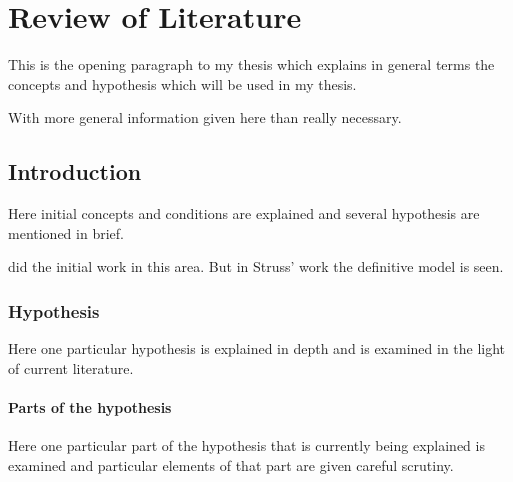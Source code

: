\chapter{Review of Literature}

This is the opening paragraph to my thesis which
explains in general terms the concepts and hypothesis
which will be used in my thesis.

With more general information given here than really
necessary.

\section{Introduction}

Here initial concepts and conditions are explained and
several hypothesis are mentioned in brief.

did the initial work in this area. But in Struss' work \autocite{buiEveryGeneratingPolytope2023}
the definitive model is seen.

\subsection{Hypothesis}

Here one particular hypothesis is explained in depth
and is examined in the light of current literature.

\subsubsection{Parts of the hypothesis}

Here one particular part of the hypothesis that is
currently being explained is examined and particular
elements of that part are given careful scrutiny.


